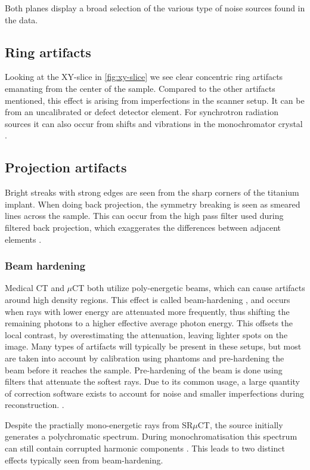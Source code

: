 Both planes display a broad selection of the various type of noise sources found in the data.

\subsection{Ring artifacts}

Looking at the XY-slice in \cref{fig:xy-slice} we see clear concentric ring artifacts emanating from
the center of the sample. Compared to the other artifacts mentioned, this effect is arising from
imperfections in the scanner setup. It can be from an uncalibrated or defect detector element. For
synchrotron radiation sources it can also occur from shifts and vibrations in the monochromator
crystal \citep{ringartifacts}.

\subsection{Projection artifacts}

Bright streaks with strong edges are seen from the sharp corners of the titanium implant. When
doing back projection, the symmetry breaking is seen as smeared lines across the sample. This
can occur from the high pass filter used during filtered back projection, which exaggerates the
differences between adjacent elements \citep{ctnoise}.

\subsubsection{Beam hardening}

Medical CT and $\mu$CT both utilize poly-energetic beams, which can cause artifacts around high
density regions. This effect is called beam-hardening , and occurs when rays with
lower energy are attenuated more frequently, thus shifting the remaining photons to a higher
effective average photon energy. This offsets the local contrast, by overestimating
the attenuation, leaving lighter spots on the image. Many types of artifacts will typically be
present in these setups, but most are taken into account by calibration using phantoms and
pre-hardening the beam before it reaches the sample. Pre-hardening of the beam is done using
filters that attenuate the softest rays. Due to its common usage, a large quantity of correction software exists
to account for noise and smaller imperfections during reconstruction. .

Despite the practially mono-energetic rays from SR$\mu$CT, the source initially generates a
polychromatic spectrum. During monochromatisation this spectrum can still contain corrupted harmonic
components \citep{srnoise}. This leads to two distinct effects typically seen from beam-hardening.

